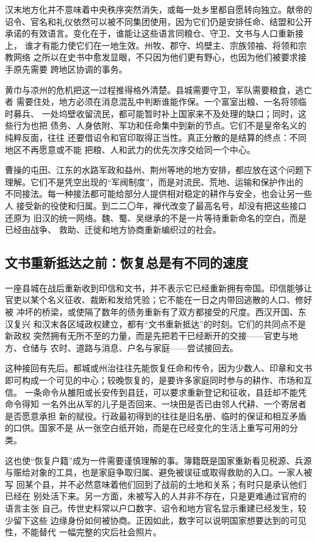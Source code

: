 汉末地方化并不意味着中央秩序突然消失，或每一处乡里都自愿转向独立。献帝的
诏令、官名和礼仪依然可以被不同集团使用，因为它们仍是安排任命、结盟和公开
承诺的有效语言。变化在于，谁能让这些语言同粮仓、守卫、文书与人口重新接上，
谁才有能力使它们在一地生效。州牧、郡守、坞壁主、宗族领袖、将领和宗教网络
之所以在史书中愈发显眼，不只因为他们更有野心，也因为他们被要求接手原先需要
跨地区协调的事务。

黄巾与凉州的危机把这一过程推得格外清楚。县城需要守卫，军队需要粮食，逃亡者
需要住处，地方必须在消息混乱中判断谁能作保。一个富室出粮、一名将领临时募兵、
一处坞壁收留流民，都可能暂时补上国家来不及处理的缺口；同时，这些行为也把
债务、人身依附、军功和任命集中到新的节点。它们不是皇帝名义的纯粹反面，往往
还要借诏令和官印取得正当性。真正分散的是结算的终点：不同地区不再愿意或不能
把粮、人和武力的优先次序交给同一个中心。

曹操的屯田、江东的水路军政和益州、荆州等地的地方安排，都应放在这个问题下
理解。它们不是凭空出现的“军阀制度”，而是对流民、荒地、运输和保护作出的
不同接法。每一种接法都可能给部分人提供相对稳定的耕作与安全，也会让另一些人
接受新的役使和归属。到二二〇年，禅代改变了最高名号，却没有把这些接口还原为
旧汉的统一网络。魏、蜀、吴继承的不是一片等待重新命名的空白，而是已经由战争、
救助、迁徙和地方协商重新编织过的社会。

\subsection{文书重新抵达之前：恢复总是有不同的速度}

一座县城在战后重新收到印信和文书，并不表示它已经重新拥有帝国。印信能够让
官吏以某个名义征收、裁断和发给凭验；它不能在一日之内带回逃散的人口、修好被
冲坏的桥梁，或使隔了数年的债务重新有了双方都接受的尺度。西汉开国、东汉复兴
和汉末各区域政权建立，都有“文书重新抵达”的时刻。它们的共同点不是新政权
突然拥有无所不至的力量，而是先把若干已经断开的交接——官吏与地方、仓储与
农时、道路与消息、户名与家庭——尝试接回去。

这种接回有先后。都城或州治往往先能恢复任命和传令，因为少数人、印章和文书
即可构成一个可见的中心；较晚恢复的，是要许多家庭同时参与的耕作、市场和互信。
一条命令从雒阳或长安传到县廷，可以要求重新登记和征收，县廷却不能凭命令得知
一名外出从军的儿子是否回来、一块田是否已由邻人代耕、一个寄居者是否愿意承担
新的赋役。行政最初得到的往往是旧名册、临时的保证和相互矛盾的口供。国家不是
从一张空白纸开始，而是在已经变化的生活上重写可用的分类。

这也使“恢复户籍”成为一件需要谨慎理解的事。簿籍既是国家重新看见税源、兵源
与赈给对象的工具，也是家庭争取归属、避免被误征或取得救助的入口。一家人被写
回某个县，并不必然意味着他们回到了战前的土地和关系；有时只是承认他们已经在
别处活下来。另一方面，未被写入的人并非不存在，只是更难通过官府的语言主张
自己。传世史料常以户口数字、诏令和地方官名显示重建已经发生，较少留下这些
边缘身份如何被协商。正因如此，数字可以说明国家想要达到的可见性，不能替代
一幅完整的灾后社会照片。

